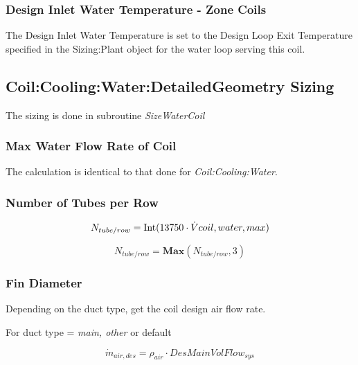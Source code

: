 \subsubsection{Design Inlet Water Temperature - Zone Coils}\label{design-inlet-water-temperature---zone-coils}

The Design Inlet Water Temperature is set to the Design Loop Exit Temperature specified in the Sizing:Plant object for the water loop serving this coil.

\subsection{Coil:Cooling:Water:DetailedGeometry Sizing}\label{coilcoolingwaterdetailedgeometry-sizing}

The sizing is done in subroutine \emph{SizeWaterCoil}

\subsubsection{Max Water Flow Rate of Coil}\label{max-water-flow-rate-of-coil}

The calculation is identical to that done for \emph{Coil:Cooling:Water}.

\subsubsection{Number of Tubes per Row}\label{number-of-tubes-per-row}

\begin{equation}
N_{tube/row} = {\mathop{\rm Int}\nolimits} ({\rm{13750}}\cdot \dot Vcoil,water,max)
\end{equation}

\begin{equation}
N_{tube/row} = \textbf{Max}(N_{tube/row},3)
\end{equation}

\subsubsection{Fin Diameter}\label{fin-diameter}

Depending on the duct type, get the coil design air flow rate.

For duct type = \emph{main, other} or default

\begin{equation}
\dot m_{air,des} = \rho_{air}\cdot DesMainVolFlow_{sys}
\end{equation}

